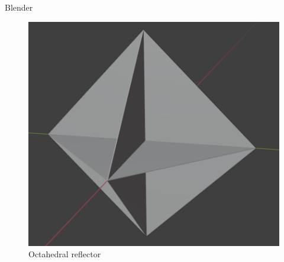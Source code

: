 \documentclass{beamer}
\begin{document}
\begin{frame}[t]{Blender}
\begin{itemize}
\begin{figure}
\begin{minipage}{0.45\textwidth}
            \includegraphics[height=0.5\textheight]{figures/octa_reflector.png}
            \caption{Octahedral reflector}
        \end{minipage}
    \end{figure}
\end{itemize}
\end{frame}
\end{document}
